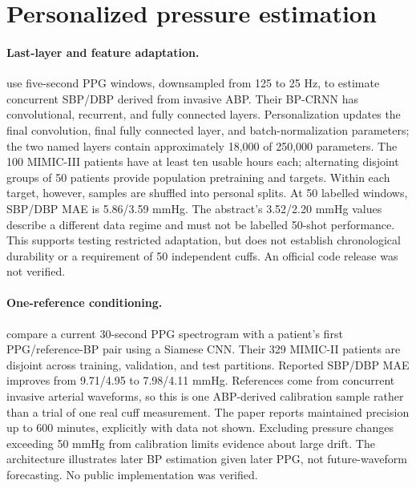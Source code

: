\documentclass[11pt]{article}
\begin{document}
\section{Personalized pressure estimation}
\paragraph{Last-layer and feature adaptation.}
\citet{leitner2022} use five-second PPG windows, downsampled from 125 to 25 Hz, to estimate concurrent SBP/DBP derived from invasive ABP. Their BP-CRNN has convolutional, recurrent, and fully connected layers. Personalization updates the final convolution, final fully connected layer, and batch-normalization parameters; the two named layers contain approximately 18,000 of 250,000 parameters. The 100 MIMIC-III patients have at least ten usable hours each; alternating disjoint groups of 50 patients provide population pretraining and targets. Within each target, however, samples are shuffled into personal splits. At 50 labelled windows, SBP/DBP MAE is 5.86/3.59 mmHg. The abstract's 3.52/2.20 mmHg values describe a different data regime and must not be labelled 50-shot performance. This supports testing restricted adaptation, but does not establish chronological durability or a requirement of 50 independent cuffs. An official code release was not verified.

\paragraph{One-reference conditioning.}
\citet{schlesinger2020} compare a current 30-second PPG spectrogram with a patient's first PPG/reference-BP pair using a Siamese CNN. Their 329 MIMIC-II patients are disjoint across training, validation, and test partitions. Reported SBP/DBP MAE improves from 9.71/4.95 to 7.98/4.11 mmHg. References come from concurrent invasive arterial waveforms, so this is one ABP-derived calibration sample rather than a trial of one real cuff measurement. The paper reports maintained precision up to 600 minutes, explicitly with data not shown. Excluding pressure changes exceeding 50 mmHg from calibration limits evidence about large drift. The architecture illustrates later BP estimation given later PPG, not future-waveform forecasting. No public implementation was verified.
\end{document}

